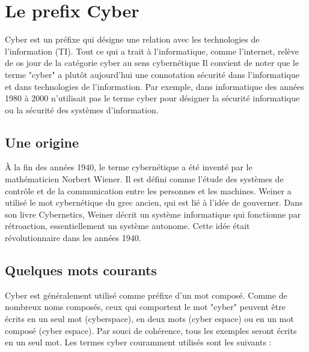 %
%



\section{Le prefix Cyber}

Cyber est un préfixe qui désigne une relation avec les technologies de l'information (TI). Tout ce qui a trait à l'informatique, comme l'internet, relève de os jour de la catégorie cyber au sens cybernétique Il convient de noter que le terme "cyber" a plutôt aujourd'hui une connotation sécurité dans l'informatique et dans technologies de l'information. Par exemple, dans informatique des années 1980 à 2000 n'utilisait pas le terme cyber pour désigner la sécurité informatique ou la sécurité des systèmes d'information.

\subsection{Une origine}

À la fin des années 1940, le terme cybernétique a été inventé par le mathématicien Norbert Wiener. Il est défini comme l'étude des systèmes de contrôle et de la communication entre les personnes et les machines. Weiner a utilisé le mot cybernétique du grec ancien, qui est lié à l'idée de gouverner. Dans son livre Cybernetics, Weiner décrit un système informatique qui fonctionne par rétroaction, essentiellement un système autonome. Cette idée était révolutionnaire dans les années 1940.

\subsection{Quelques mots courants}

Cyber est généralement utilisé comme préfixe d'un mot composé. Comme de nombreux noms composés, ceux qui comportent le mot "cyber" peuvent être écrits en un seul mot (cyberspace), en deux mots (cyber espace) ou en un mot composé (cyber espace). Par souci de cohérence, tous les exemples seront écrits en un seul mot. Les termes cyber couramment utilisés sont les suivants :


